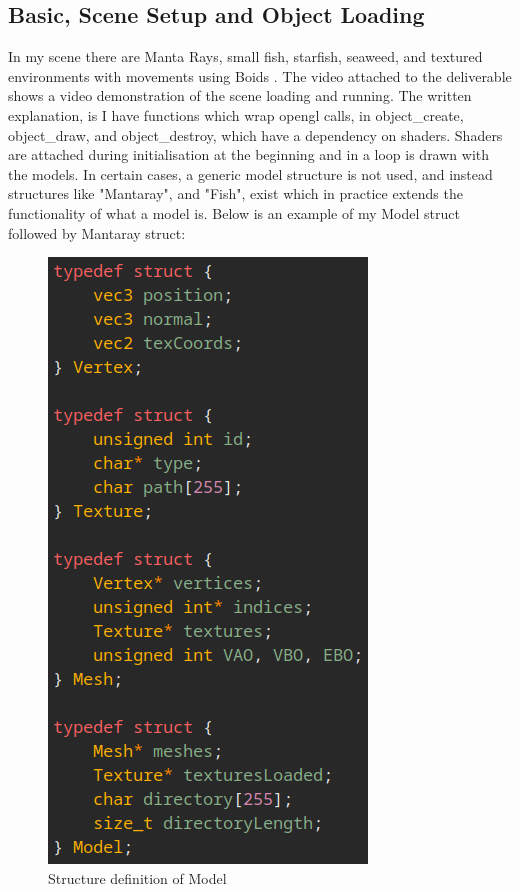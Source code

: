 \documentclass[a4paper, 10pt]{article}
\begin{document}
\subsection{Basic, Scene Setup and Object Loading}
In my scene there are Manta Rays, small fish, starfish, seaweed, and textured environments with movements using Boids \cite{boids}.
The video attached to the deliverable shows a video demonstration of the scene loading and running. The written explanation, is
I have functions which wrap opengl calls, in object\_create, object\_draw, and object\_destroy, which have a dependency on shaders.
Shaders are attached during initialisation at the beginning and in a loop is drawn with the models. In certain cases, a generic model
structure is not used, and instead structures like "Mantaray", and "Fish", exist which in practice extends the functionality of what 
a model is. Below is an example of my Model struct followed by Mantaray struct:

\begin{figure}[h]
    \centering
    \includegraphics[scale=1.0]{images/model-struct}
    \caption{Structure definition of Model}
    \label{fig:model-struct}
\end{figure}
\end{document}
